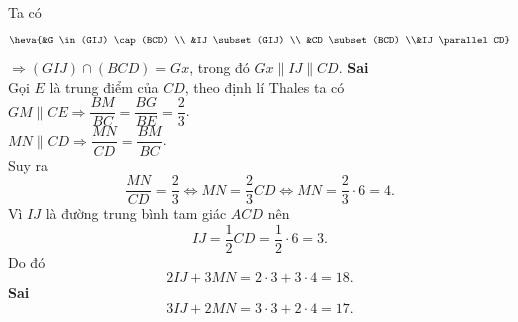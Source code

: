 \begin{ex}
{\begin{itemchoice}
			Ta có 
			 \[
			\heva{&G \in (GIJ) \cap (BCD) \\ &IJ \subset (GIJ) \\ &CD \subset (BCD) \\&IJ \parallel  CD}
			 \]
			$\Rightarrow (GIJ) \cap  (BCD)=Gx$, trong đó $Gx \parallel IJ \parallel CD$.
			 \itemch \textbf{Sai}\\
			Gọi $E$ là trung điểm của $CD$, theo định lí  Thales ta có\\
			$GM \parallel CE \Rightarrow \dfrac{BM}{BC}  = \dfrac{BG}{BE} = \dfrac{2}{3}$.\\
			$MN \parallel CD  \Rightarrow \dfrac{MN}{CD} = \dfrac{BM}{BC}$.\\
			 Suy ra
			\[ 
			\dfrac{MN}{CD} = \dfrac{2}{3} \Leftrightarrow MN = \dfrac{2}{3}CD \Leftrightarrow MN = \dfrac{2}{3} \cdot  6 = 4.
			 \]
			Vì $IJ$ là đường  trung bình tam giác $ACD$ nên
			 \[
			IJ = \dfrac{1}{2}CD =  \dfrac{1}{2} \cdot 6 = 3.
			\] 
			Do đó 
			\[ 
			2IJ  + 3MN = 2 \cdot 3 + 3 \cdot 4 = 18.
			\] 
			\itemch  \textbf{Sai} \\
			 \[
			3IJ + 2MN =  3 \cdot 3 + 2 \cdot 4 = 17.
			 \]
		\end{itemchoice}
	 }
\end{ex}

